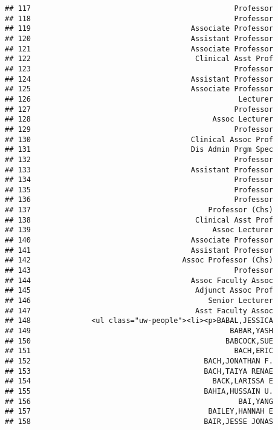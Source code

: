 \documentclass[
]{article}
\begin{document}
\begin{verbatim}
## 117                                               Professor
## 118                                               Professor
## 119                                     Associate Professor
## 120                                     Assistant Professor
## 121                                     Associate Professor
## 122                                      Clinical Asst Prof
## 123                                               Professor
## 124                                     Assistant Professor
## 125                                     Associate Professor
## 126                                                Lecturer
## 127                                               Professor
## 128                                          Assoc Lecturer
## 129                                               Professor
## 130                                     Clinical Assoc Prof
## 131                                     Dis Admin Prgm Spec
## 132                                               Professor
## 133                                     Assistant Professor
## 134                                               Professor
## 135                                               Professor
## 136                                               Professor
## 137                                         Professor (Chs)
## 138                                      Clinical Asst Prof
## 139                                          Assoc Lecturer
## 140                                     Associate Professor
## 141                                     Assistant Professor
## 142                                   Assoc Professor (Chs)
## 143                                               Professor
## 144                                     Assoc Faculty Assoc
## 145                                      Adjunct Assoc Prof
## 146                                         Senior Lecturer
## 147                                      Asst Faculty Assoc
## 148              <ul class="uw-people"><li><p>BABAL,JESSICA
## 149                                              BABAR,YASH
## 150                                             BABCOCK,SUE
## 151                                               BACH,ERIC
## 152                                        BACH,JONATHAN F.
## 153                                        BACH,TAIYA RENAE
## 154                                          BACK,LARISSA E
## 155                                        BAHIA,HUSSAIN U.
## 156                                                BAI,YANG
## 157                                         BAILEY,HANNAH E
## 158                                        BAIR,JESSE JONAS

\end{verbatim}
\end{document}
